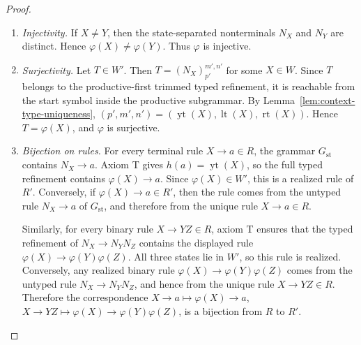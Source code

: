 \documentclass[sub]{jalc}
\newcommand{\yt}{\operatorname{yt}}
\newcommand{\lt}{\operatorname{lt}}
\newcommand{\rt}{\operatorname{rt}}
\newcommand{\Reach}{\operatorname{Reach}}
\begin{document}
\begin{proof}
\begin{enumerate}[label=\textup{(\arabic*)},leftmargin=2.4em]
If \(\sigma(X)=k>0\), then, since \(X\in\Reach(W,R,S)\) and \(X\notin S\), there are \(U\in W\) with \(\sigma(U)<k\) and a rule \(U\to YZ\in R\) such that \(X=Y\) or \(X=Z\). By induction, \(\varphi(U)\) is reachable from \(\widetilde S\) inside the productive subgrammar. The state-separated grammar contains \(N_U\to N_YN_Z\), and axiom T for \(U\to YZ\) gives \(\yt(Y)\yt(Z)=\yt(U)\), \(\lt(Y)=\lt(U)\), \(\rt(Y)=\yt(Z)\rt(U)\), \(\lt(Z)=\lt(U)\yt(Y)\), and \(\rt(Z)=\rt(U)\). Thus the full typed refinement contains the typed binary rule \(\varphi(U)\to\varphi(Y)\varphi(Z)\). By Lemma~\ref{lem:correct-copy-productive}, both \(\varphi(Y)\) and \(\varphi(Z)\) are productive. Hence this binary rule belongs to the productive subgrammar. Since \(\varphi(U)\) is reachable there, both \(\varphi(Y)\) and \(\varphi(Z)\) are reachable there. In particular, the one equal to \(\varphi(X)\) is reachable in the productive subgrammar.

Thus \(\varphi(X)\in W'\) for every \(X\in W\).

\item \emph{Injectivity.} If \(X\neq Y\), then the state-separated nonterminals \(N_X\) and \(N_Y\) are distinct. Hence \(\varphi(X)\neq\varphi(Y)\). Thus \(\varphi\) is injective.

\item \emph{Surjectivity.} Let \(T\in W'\). Then \(T=(N_X)_{p'}^{m',n'}\) for some \(X\in W\). Since \(T\) belongs to the productive-first trimmed typed refinement, it is reachable from the start symbol inside the productive subgrammar. By Lemma~\ref{lem:context-type-uniqueness}, \((p',m',n')=(\yt(X),\lt(X),\rt(X))\). Hence \(T=\varphi(X)\), and \(\varphi\) is surjective.

\item \emph{Bijection on rules.} For every terminal rule \(X\to a\in R\), the grammar \(G_{\mathrm{st}}\) contains \(N_X\to a\). Axiom T gives \(h(a)=\yt(X)\), so the full typed refinement contains \(\varphi(X)\to a\). Since \(\varphi(X)\in W'\), this is a realized rule of \(R'\). Conversely, if \(\varphi(X)\to a\in R'\), then the rule comes from the untyped rule \(N_X\to a\) of \(G_{\mathrm{st}}\), and therefore from the unique rule \(X\to a\in R\).

Similarly, for every binary rule \(X\to YZ\in R\), axiom T ensures that the typed refinement of \(N_X\to N_YN_Z\) contains the displayed rule \(\varphi(X)\to\varphi(Y)\varphi(Z)\). All three states lie in \(W'\), so this rule is realized. Conversely, any realized binary rule \(\varphi(X)\to\varphi(Y)\varphi(Z)\) comes from the untyped rule \(N_X\to N_YN_Z\), and hence from the unique rule \(X\to YZ\in R\). Therefore the correspondence \(X\to a\mapsto\varphi(X)\to a\), \(X\to YZ\mapsto\varphi(X)\to\varphi(Y)\varphi(Z)\), is a bijection from \(R\) to \(R'\).


\end{enumerate}
\end{proof}
\end{document}
